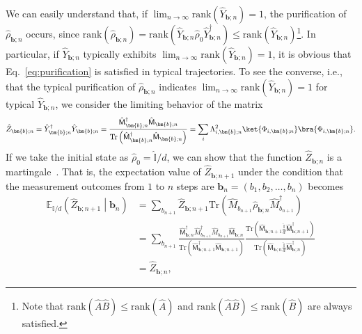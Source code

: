 \documentclass[preprint,pteplogo]{ptephy_v2}%
\numberwithin{equation}{section}
\theoremstyle{definition}
\newcommand{\mr}[1]{\mathrm{#1}}
\newcommand{\mbb}[1]{\mathbb{#1}}
\begin{document}
We can easily understand that, if $\lim_{n\rightarrow\infty}\mathrm{rank}\left(\hat{Y}_{\bm{b};n}\right)=1$, the purification of $\hat{\rho}_{\bm{b};n}$ occurs, since $\mathrm{rank}\left(\hat{\rho}_{\bm{b};n}\right)=\mathrm{rank}\left(\hat{Y}_{\bm{b};n}\hat{\rho}_0\hat{Y}_{\bm{b};n}^\dagger\right)\leq\mathrm{rank}\left(\hat{Y}_{\bm{b};n}\right)$\footnote{
Note that $\mr{rank}(\hat{A}\hat{B})\leq \mr{rank}(\hat{A})$ and $\mr{rank}(\hat{A}\hat{B})\leq \mr{rank}(\hat{B})$ are always satisfied.
}. 
In particular, if $\hat{Y}_{\bm{b};n}$ typically exhibits $\lim_{n\rightarrow\infty}\mathrm{rank}\left(\hat{Y}_{\bm{b};n}\right)=1$, it is obvious that Eq.~\eqref{eq:purification} is satisfied in typical trajectories. 
To see the converse, i.e., that the typical purification of $\hat{\rho}_{\bm{b};n}$ indicates $\lim_{n\rightarrow\infty}\mathrm{rank}\left(\hat{Y}_{\bm{b};n}\right)=1$ for typical $\hat{Y}_{\bm{b};n}$, we consider the limiting behavior of the matrix 
\begin{align}
    \hat{Z}_{\bm{b};n}=\hat{Y}_{\bm{b};n}^\dagger\hat{Y}_{\bm{b};n}=\frac{\hat{\mathsf{M}}_{\bm{b};n}^\dagger\hat{\mathsf{M}}_{\bm{b};n}}
    {\mathrm{Tr}\left(\hat{\mathsf{M}}_{\bm{b};n}^\dagger\hat{\mathsf{M}}_{\bm{b};n}\right)}
    =\sum_i\Lambda_{i,\bm{b};n}^2\ket{\Phi_{i,\bm{b};n}}\bra{\Phi_{i,\bm{b};n}}.
    \label{eq:Zn}
\end{align}
If we take the initial state as $\hat{\rho}_0=\hat{\mbb{I}}/d$, we can show that the function $\hat{Z}_{\bm{b};n}$ is a martingale~\cite{hall2014martingale}. 
That is, the expectation value of $\hat{Z}_{\bm{b};n+1}$ under the condition that the measurement outcomes from $1$ to $n$ steps are $\bm{b}_n=(b_1,b_2,\ldots,b_n)$ becomes
\begin{align}
    \mathbb{E}_{\mathbb{I}/d}\left(\hat{Z}_{\bm{b};n+1} \middle| \bm{b}_n\right)
    &=\sum_{b_{n+1}}\hat{Z}_{\bm{b};n+1}
    \mathrm{Tr}\left(\hat{M}_{b_{n+1}}
    \hat{\rho}_{\bm{b};n}\hat{M}_{b_{n+1}}^\dagger\right)\nonumber\\
    &=\sum_{b_{n+1}}
    \frac{\hat{\mathsf{M}}_{\bm{b};n}^\dagger\hat{M}_{b_{n+1}}^\dagger\hat{M}_{b_{n+1}}\hat{\mathsf{M}}_{\bm{b};n}}
    {\mathrm{Tr}\left(\hat{\mathsf{M}}_{\bm{b};n+1}^\dagger\hat{\mathsf{M}}_{\bm{b};n+1}\right)}
    \frac{\mathrm{Tr}\left(\hat{\mathsf{M}}_{\bm{b};n+1}\frac{\hat{\mathbb{I}}}{d}
    \hat{\mathsf{M}}_{\bm{b};n+1}^\dagger\right)}
    {\mathrm{Tr}\left(\hat{\mathsf{M}}_{\bm{b};n}\frac{\hat{\mathbb{I}}}{d}\hat{\mathsf{M}}_{\bm{b};n}^\dagger\right)}
    \nonumber\\&=\hat{Z}_{\bm{b};n},
    \label{eq:martingale_Zn}
\end{align}
\end{document}

